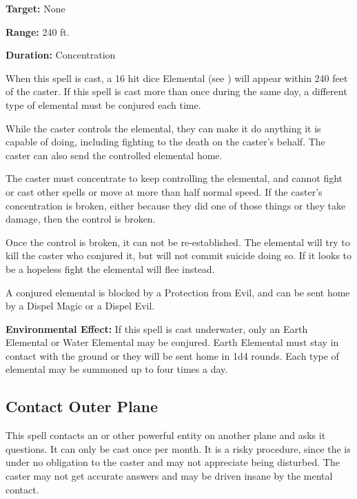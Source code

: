 \begin{multicols*}{2}
{\textbf{Target:} None

\textbf{Range:} 240 ft.

\textbf{Duration:} Concentration}

When this spell is cast, a 16 hit dice Elemental (see ) will appear within 240 feet of the caster. If this spell is cast more than once during the same day, a different type of elemental must be conjured each time.

While the caster controls the elemental, they can make it do anything it is capable of doing, including fighting to the death on the caster’s behalf. The caster can also send the controlled elemental home.

The caster must concentrate to keep controlling the elemental, and cannot fight or cast other spells or move at more than half normal speed. If the caster’s concentration is broken, either because they did one of those things or they take damage, then the control is broken.

Once the control is broken, it can not be re-established. The elemental will try to kill the caster who conjured it, but will not commit suicide doing so. If it looks to be a hopeless fight the elemental will flee instead.

A conjured elemental is blocked by a Protection from Evil, and can be sent home by a Dispel Magic or a Dispel Evil.

\textbf{Environmental Effect:} If this spell is cast underwater, only an Earth Elemental or Water Elemental may be conjured. Earth Elemental must stay in contact with the ground or they will be sent home in 1d4 rounds. Each type of elemental may be summoned up to four times a day.

\subsection{Contact Outer Plane}\label{spell:Contact Outer Plane}

This spell contacts an  or other powerful entity on another plane and asks it questions. It can only be cast once per month. It is a risky procedure, since the  is under no obligation to the caster and may not appreciate being disturbed. The caster may not get accurate answers and may be driven insane by the mental contact.


\end{multicols*}
